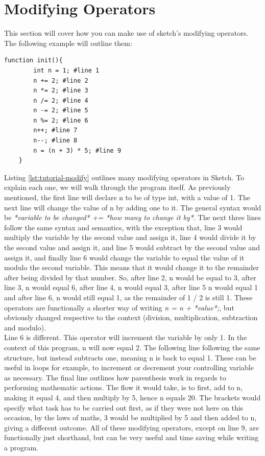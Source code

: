 \documentclass{l3proj}
\begin{document}
\section{Modifying Operators}
This section will cover how you can make use of sketch's modifying operators. The following example will outline them:
\begin{lstlisting}[caption={Modifying Operators in Action}, label={lst:tutorial-modify}]
    function init(){
        int n = 1; #line 1
        n += 2; #line 2
        n *= 2; #line 3
        n /= 2; #line 4
        n -= 2; #line 5
        n %= 2; #line 6
        n++; #line 7
        n--; #line 8
        n = (n + 3) * 5; #line 9
    }
\end{lstlisting}
Listing \ref{lst:tutorial-modify} outlines many modifying operators in Sketch. To explain each one, we will walk through the program itself. As previously mentioned, the first line will declare n to be of type int, with a value of 1. The next line will change the value of n by adding one to it. The general syntax would be \textit{*variable to be changed* += *how many to change it by*}. The next three lines follow the same syntax and semantics, with the exception that, line 3 would multiply the variable by the second value and assign it, line 4 would divide it by the second value and assign it, and line 5 would subtract by the second value and assign it, and finally line 6 would change the variable to equal the value of it modulo the second variable. This means that it would change it to the remainder after being divided by that number. So, after line 2, n would be equal to 3, after line 3, n would equal 6, after line 4, n would equal 3, after line 5 n would equal 1 and after line 6, n would still equal 1, as the remainder of 1 / 2 is still 1. These operators are functionally a shorter way of writing \textit{n = n + *value*;}, but obviously changed respective to the context (division, multiplication, subtraction and modulo).
\\ [12pt]
Line 6 is different. This operator will increment the variable by only 1. In the context of this program, n will now equal 2. The following line following the same structure, but instead subtracts one, meaning n is back to equal 1. These can be useful in loops for example, to increment or decrement your controlling variable as necessary. The final line outlines how parenthesis work in regards to performing mathematic actions. The flow it would take, is to first, add  to n, making it equal 4, and then multiply by 5, hence n equals 20. The brackets would specify what task has to be carried out first, as if they were not here on this occasion, by the laws of maths, 3 would be multiplied by 5 and then added to n, giving a different outcome. All of these modifying operators, except on line 9, are functionally just shorthand, but can be very useful and time saving while writing a program.
\end{document}
